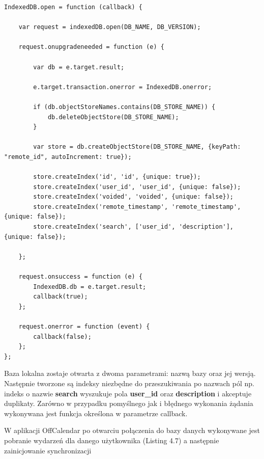 \begin{lstlisting}[style=js, caption=Otwarcie połączenia z lokalną bazą danych., label=amb, captionpos=b]
IndexedDB.open = function (callback) {

    var request = indexedDB.open(DB_NAME, DB_VERSION);

    request.onupgradeneeded = function (e) {

        var db = e.target.result;

        e.target.transaction.onerror = IndexedDB.onerror;

        if (db.objectStoreNames.contains(DB_STORE_NAME)) {
            db.deleteObjectStore(DB_STORE_NAME);
        }

        var store = db.createObjectStore(DB_STORE_NAME, {keyPath: "remote_id", autoIncrement: true});

        store.createIndex('id', 'id', {unique: true});
        store.createIndex('user_id', 'user_id', {unique: false});
        store.createIndex('voided', 'voided', {unique: false});
        store.createIndex('remote_timestamp', 'remote_timestamp', {unique: false});
        store.createIndex('search', ['user_id', 'description'], {unique: false});

    };

    request.onsuccess = function (e) {
        IndexedDB.db = e.target.result;
        callback(true);
    };

    request.onerror = function (event) {
        callback(false);
    };
};
\end{lstlisting}

Baza lokalna zostaje otwarta z dwoma parametrami: nazwą bazy oraz jej wersją. Następnie tworzone są indeksy niezbędne do przeszukiwania po nazwach pól np. indeks o nazwie \textbf{search} wyszukuje pola \textbf{user\_id} oraz \textbf{description} i akceptuje duplikaty. Zarówno w przypadku pomyślnego jak i błędnego wykonania żądania wykonywana jest funkcja określona w parametrze callback. 

W aplikacji OffCalendar po otwarciu połączenia do bazy danych wykonywane jest pobranie wydarzeń dla danego użytkownika (Listing 4.7) a następnie zainicjowanie synchronizacji

